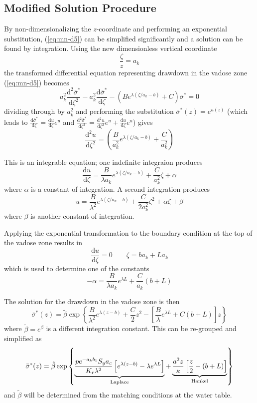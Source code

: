 \documentclass{article}
\begin{document}
\subsection{Modified Solution Procedure} 
By non-dimensionalizing the $z$-coordinate and performing an exponential substitution, (\ref{eq:mn-d5}) can be simplified significantly and a solution can be found by integration.  Using the new dimensionless vertical coordinate 
$$ \frac{\zeta}{z}=a_k $$
the transformed differential equation representing drawdown in the vadose zone (\ref{eq:mn-d5}) becomes
\begin{equation}
  \label{eq:nondimODE}
  a_k^2 \frac{\mathrm{d}^2 \bar{\sigma}^{\ast}}{\mathrm{d}\zeta^2} - a_k^2 \frac{\mathrm{d} \bar{\sigma}^{\ast}}{\mathrm{d}\zeta} - \left( B e^{\lambda (\zeta/a_k-b)} + C\right) \bar{\sigma}^{\ast}=0
\end{equation}
dividing through by $a_k^2$ and performing the substitution $\bar{\sigma}^{\ast}(z)=e^{u(z)}$ (which leads to $\frac{\mathrm{d}\bar{\sigma}^{\ast}}{\mathrm{d}\zeta} = \frac{\mathrm{d}u}{\mathrm{d}\zeta}e^u$ and $\frac{\mathrm{d}^2\bar{\sigma}^{\ast}}{\mathrm{d}\zeta^2} = \frac{\mathrm{d}^2u}{\mathrm{d}\zeta^2}e^u + \frac{\mathrm{d}u}{\mathrm{d}\zeta}e^u$) gives
\begin{equation}
  \label{eq:expsubODE}
   \frac{\mathrm{d}^2 u}{\mathrm{d}\zeta^2} = \left( \frac{B}{a_k^2} e^{\lambda (\zeta/a_k-b)} + \frac{C}{a_k^2}\right) 
\end{equation}

This is an integrable equation; one indefinite integraion produces
$$ \frac{\mathrm{d} u}{\mathrm{d}\zeta} =  \frac{B}{\lambda a_k} e^{\lambda (\zeta/a_k-b)} + \frac{C}{a_k^2}\zeta + \alpha  $$
where $\alpha$ is a constant of integration. A second integration produces
$$ u =  \frac{B}{\lambda^2} e^{\lambda (\zeta/a_k-b)} + \frac{C}{2a_k^2}\zeta^2 + \alpha\zeta + \beta  $$
where $\beta$ is another constant of integration.  

Applying the exponential transformation to the boundary condition at the top of the vadose zone results in
$$\frac{\mathrm{d}u}{\mathrm{d}\zeta}=0 \qquad \zeta=ba_k + La_k$$
which is used to determine one of the constants
$$-\alpha= \frac{B}{\lambda a_k} e^{\lambda L} + \frac{C}{a_k} \left( b+L\right) $$

The solution for the drawdown in the vadose zone is then
\begin{equation}
  \nonumber
  \bar{\sigma}^{\ast} (z) = \tilde{\beta}\exp\left\{ \frac{B}{\lambda^2} e^{\lambda (z-b)} + \frac{C}{2}z^2 -\left[\frac{B}{\lambda} e^{\lambda L} + C \left( b+L\right)\right]z  \right\}
\end{equation}
where $\tilde{\beta}=e^\beta$ is a different integration constant. This can be re-grouped and simplified as
\begin{equation}
  \label{eq:sigma}
  \bar{\sigma}^{\ast} (z) = \tilde{\beta}\exp\left\{  \underbrace{\frac{p e^{-a_k b_1} S_y a_c} {K_r \lambda^2} \left[ e^{\lambda (z-b)}  - \lambda e^{\lambda L} \right]}_{\rm Laplace} + \underbrace{\frac{a^2 z}{\kappa}\left[\frac{z}{2} - \left( b+L\right) \right]}_{\rm Hankel}  \right\}
\end{equation}
and $\tilde{\beta}$ will be determined from the matching conditions at the water table.
\end{document}
